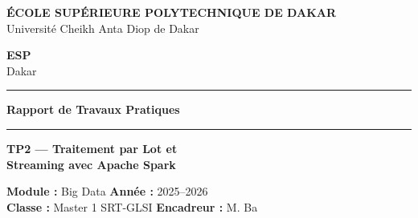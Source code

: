 \documentclass[12pt,a4paper]{report}
\begin{document}
\begin{titlepage}
\thispagestyle{empty}

\noindent\colorbox{bleuESP}{\parbox{\textwidth}{
  \vspace{8pt}
  \centering
  \color{white}\large\textbf{ÉCOLE SUPÉRIEURE POLYTECHNIQUE DE DAKAR}\\
  \color{white}\normalsize Université Cheikh Anta Diop de Dakar
  \vspace{8pt}
}}

\vspace{0.5cm}

\begin{center}
  \begin{tcolorbox}[
    width=4cm,
    height=4cm,
    colback=bleuESP!10,
    colframe=bleuESP,
    halign=center,
    valign=center
  ]
  \centering\color{bleuESP}\textbf{\Large ESP}\\
  \small Dakar
  \end{tcolorbox}

  \vspace{0.8cm}

  {\color{bleuESP}\rule{0.8\textwidth}{1.5pt}}

  \vspace{0.5cm}

  {\huge\bfseries\color{bleuESP} Rapport de Travaux Pratiques}

  \vspace{0.3cm}

  {\color{bleuClair}\rule{0.6\textwidth}{0.8pt}}

  \vspace{0.3cm}

  {\LARGE\bfseries TP2 — Traitement par Lot et}\\[0.2cm]
  {\LARGE\bfseries Streaming avec Apache Spark}

  \vspace{0.5cm}

  \begin{tcolorbox}[
    colback=bleuESP!8,
    colframe=bleuESP,
    width=0.85\textwidth,
    rounded corners
  ]
  \centering
  \textbf{Module :} Big Data \hspace{1cm} \textbf{Année :} 2025--2026\\[4pt]
  \textbf{Classe :} Master 1 SRT-GLSI \hspace{0.5cm} \textbf{Encadreur :} M. Ba
  \end{tcolorbox}


\end{center}
\end{titlepage}
\end{document}
